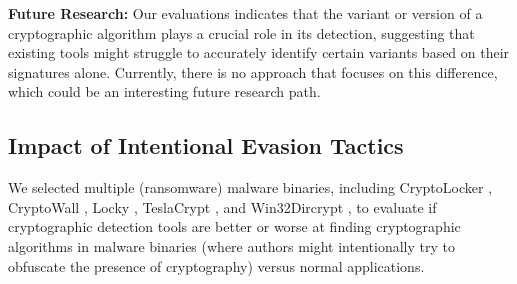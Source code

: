 
\begin{takeaway}
\textbf{Future Research:} Our evaluations indicates that the variant or version of a cryptographic algorithm plays a crucial role in its detection, suggesting that existing tools might struggle to accurately identify certain variants based on their signatures alone. Currently, there is no approach that focuses on this difference, which could be an interesting future research path.
\end{takeaway}



\subsection{Impact of Intentional Evasion Tactics}
\label{subsec:cryptobinary-algo-version1}

We selected multiple (ransomware) malware binaries, including CryptoLocker \cite{hansberry2014cryptolocker}, CryptoWall \cite{cabaj2015network}, Locky \cite{locky}, TeslaCrypt \cite{lemmou2018infection}, and Win32Dircrypt \cite{win32dircrypt}, to evaluate if cryptographic detection tools are better or worse at finding cryptographic algorithms in malware binaries (where authors might intentionally try to obfuscate the presence of cryptography) versus normal applications. 


